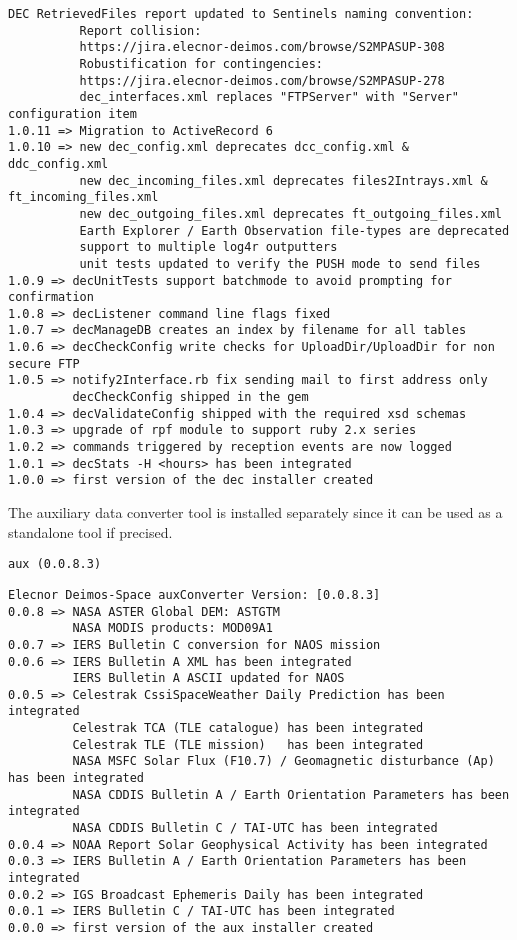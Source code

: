 \documentclass[dec_sum_main.tex]{subfiles}
\begin{document}
\begin{Verbatim}[tabsize=4]
          DEC RetrievedFiles report updated to Sentinels naming convention:
          Report collision:
          https://jira.elecnor-deimos.com/browse/S2MPASUP-308
          Robustification for contingencies:
          https://jira.elecnor-deimos.com/browse/S2MPASUP-278
          dec_interfaces.xml replaces "FTPServer" with "Server" configuration item
1.0.11 => Migration to ActiveRecord 6
1.0.10 => new dec_config.xml deprecates dcc_config.xml & ddc_config.xml
          new dec_incoming_files.xml deprecates files2Intrays.xml & ft_incoming_files.xml
          new dec_outgoing_files.xml deprecates ft_outgoing_files.xml
          Earth Explorer / Earth Observation file-types are deprecated
          support to multiple log4r outputters
          unit tests updated to verify the PUSH mode to send files
1.0.9 => decUnitTests support batchmode to avoid prompting for confirmation
1.0.8 => decListener command line flags fixed
1.0.7 => decManageDB creates an index by filename for all tables
1.0.6 => decCheckConfig write checks for UploadDir/UploadDir for non secure FTP
1.0.5 => notify2Interface.rb fix sending mail to first address only 
         decCheckConfig shipped in the gem
1.0.4 => decValidateConfig shipped with the required xsd schemas
1.0.3 => upgrade of rpf module to support ruby 2.x series
1.0.2 => commands triggered by reception events are now logged
1.0.1 => decStats -H <hours> has been integrated
1.0.0 => first version of the dec installer created
\end{Verbatim}

\par
\noindent 
The auxiliary data converter tool is installed separately since it can be used as a standalone tool if precised. \newline


\begin{Verbatim}[tabsize=4]
    aux (0.0.8.3)
\end{Verbatim}


\begin{Verbatim}[tabsize=4]
Elecnor Deimos-Space auxConverter Version: [0.0.8.3]
0.0.8 => NASA ASTER Global DEM: ASTGTM
         NASA MODIS products: MOD09A1
0.0.7 => IERS Bulletin C conversion for NAOS mission
0.0.6 => IERS Bulletin A XML has been integrated
         IERS Bulletin A ASCII updated for NAOS
0.0.5 => Celestrak CssiSpaceWeather Daily Prediction has been integrated
         Celestrak TCA (TLE catalogue) has been integrated
         Celestrak TLE (TLE mission)   has been integrated
         NASA MSFC Solar Flux (F10.7) / Geomagnetic disturbance (Ap) has been integrated
         NASA CDDIS Bulletin A / Earth Orientation Parameters has been integrated
         NASA CDDIS Bulletin C / TAI-UTC has been integrated
0.0.4 => NOAA Report Solar Geophysical Activity has been integrated
0.0.3 => IERS Bulletin A / Earth Orientation Parameters has been integrated
0.0.2 => IGS Broadcast Ephemeris Daily has been integrated
0.0.1 => IERS Bulletin C / TAI-UTC has been integrated
0.0.0 => first version of the aux installer created
\end{Verbatim}
\end{document}
